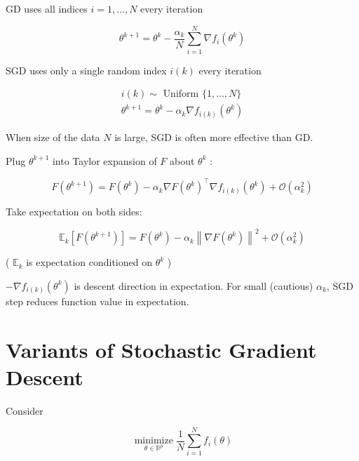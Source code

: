\documentclass{report}
\begin{document}
\begin{concept}
    GD uses all indices $i=1, \ldots, N$ every iteration

    $$
    \theta^{k+1}=\theta^{k}-\frac{\alpha_{k}}{N} \sum_{i=1}^{N} \nabla f_{i}\left(\theta^{k}\right)
    $$

    SGD uses only a single random index $i(k)$ every iteration

    $$
    \begin{gathered}
    i(k) \sim \text { Uniform }\{1, \ldots, N\} \\
    \theta^{k+1}=\theta^{k}-\alpha_{k} \nabla f_{i(k)}\left(\theta^{k}\right)
    \end{gathered}
    $$

    When size of the data $N$ is large, SGD is often more effective than GD.
\end{concept}

\begin{concept}
    Plug $\theta^{k+1}$ into Taylor expansion of $F$ about $\theta^{k}$ :

    $$
    F\left(\theta^{k+1}\right)=F\left(\theta^{k}\right)-\alpha_{k} \nabla F\left(\theta^{k}\right)^{\top} \nabla f_{i(k)}\left(\theta^{k}\right)+\mathcal{O}\left(\alpha_{k}^{2}\right)
    $$

    Take expectation on both sides:

    $$
    \mathbb{E}_{k}\left[F\left(\theta^{k+1}\right)\right]=F\left(\theta^{k}\right)-\alpha_{k}\left\|\nabla F\left(\theta^{k}\right)\right\|^{2}+\mathcal{O}\left(\alpha_{k}^{2}\right)
    $$

    ( $\mathbb{E}_{k}$ is expectation conditioned on $\theta^{k}$ )

    $-\nabla f_{i(k)}\left(\theta^{k}\right)$ is descent direction in expectation. For small (cautious) $\alpha_{k}$, SGD step reduces function value in expectation.
\end{concept}

\section{Variants of Stochastic Gradient Descent}

Consider

$$
\underset{\theta \in \mathbb{R}^{p}}{\operatorname{minimize}} \frac{1}{N} \sum_{i=1}^{N} f_{i}(\theta)
$$
\end{document}
